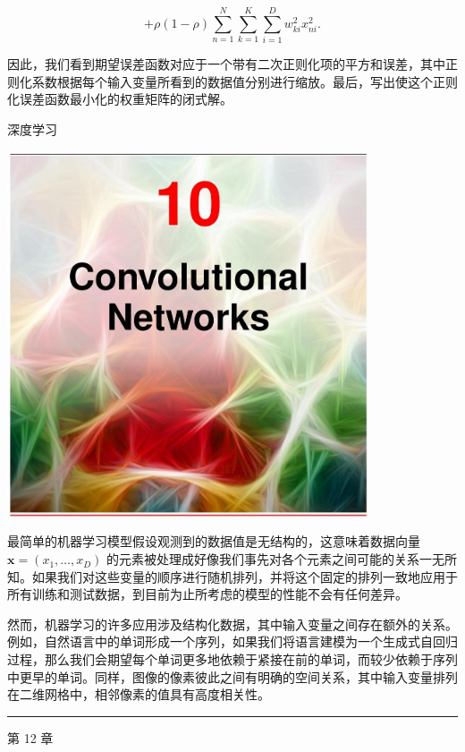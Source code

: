\documentclass[10pt]{report}
\newcommand{\HRule}{\begin{center}\rule{0.9\linewidth}{0.2mm}\end{center}}
\begin{document}
\[
+ \rho \left( {1 - \rho }\right) \mathop{\sum }\limits_{{n = 1}}^{N}\mathop{\sum }\limits_{{k = 1}}^{K}\mathop{\sum }\limits_{{i = 1}}^{D}{w}_{ki}^{2}{x}_{ni}^{2}. \tag{9.73}
\]

因此，我们看到期望误差函数对应于一个带有二次正则化项的平方和误差，其中正则化系数根据每个输入变量所看到的数据值分别进行缩放。最后，写出使这个正则化误差函数最小化的权重矩阵的闭式解。

深度学习

\begin{center}
\includegraphics[max width=0.8\textwidth]{images/0194e279-9b28-703a-88f4-c3ac21e2010d_306_473_349_1075_1088_0.jpg}
\end{center}
\hspace*{3em} 

最简单的机器学习模型假设观测到的数据值是无结构的，这意味着数据向量 \(\mathbf{x} = \left( {{x}_{1},\ldots ,{x}_{D}}\right)\) 的元素被处理成好像我们事先对各个元素之间可能的关系一无所知。如果我们对这些变量的顺序进行随机排列，并将这个固定的排列一致地应用于所有训练和测试数据，到目前为止所考虑的模型的性能不会有任何差异。

然而，机器学习的许多应用涉及结构化数据，其中输入变量之间存在额外的关系。例如，自然语言中的单词形成一个序列，如果我们将语言建模为一个生成式自回归过程，那么我们会期望每个单词更多地依赖于紧接在前的单词，而较少依赖于序列中更早的单词。同样，图像的像素彼此之间有明确的空间关系，其中输入变量排列在二维网格中，相邻像素的值具有高度相关性。

\HRule

第 12 章
\end{document}

